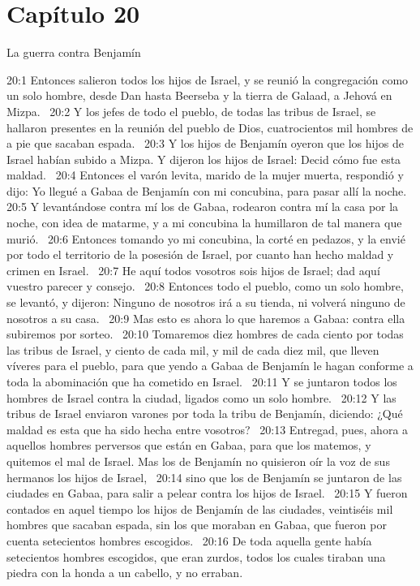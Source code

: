 \section*{Capítulo 20}
La guerra contra Benjamín  

20:1 Entonces salieron todos los hijos de Israel, y se reunió la congregación como un solo hombre, desde Dan hasta Beerseba y la tierra de Galaad, a Jehová en Mizpa.  
20:2 Y los jefes de todo el pueblo, de todas las tribus de Israel, se hallaron presentes en la reunión del pueblo de Dios, cuatrocientos mil hombres de a pie que sacaban espada.  
20:3 Y los hijos de Benjamín oyeron que los hijos de Israel habían subido a Mizpa. Y dijeron los hijos de Israel: Decid cómo fue esta maldad.  
20:4 Entonces el varón levita, marido de la mujer muerta, respondió y dijo: Yo llegué a Gabaa de Benjamín con mi concubina, para pasar allí la noche.  
20:5 Y levantándose contra mí los de Gabaa, rodearon contra mí la casa por la noche, con idea de matarme, y a mi concubina la humillaron de tal manera que murió.  
20:6 Entonces tomando yo mi concubina, la corté en pedazos, y la envié por todo el territorio de la posesión de Israel, por cuanto han hecho maldad y crimen en Israel.  
20:7 He aquí todos vosotros sois hijos de Israel; dad aquí vuestro parecer y consejo.  
20:8 Entonces todo el pueblo, como un solo hombre, se levantó, y dijeron: Ninguno de nosotros irá a su tienda, ni volverá ninguno de nosotros a su casa.  
20:9 Mas esto es ahora lo que haremos a Gabaa: contra ella subiremos por sorteo.  
20:10 Tomaremos diez hombres de cada ciento por todas las tribus de Israel, y ciento de cada mil, y mil de cada diez mil, que lleven víveres para el pueblo, para que yendo a Gabaa de Benjamín le hagan conforme a toda la abominación que ha cometido en Israel.  
20:11 Y se juntaron todos los hombres de Israel contra la ciudad, ligados como un solo hombre.  
20:12 Y las tribus de Israel enviaron varones por toda la tribu de Benjamín, diciendo: ¿Qué maldad es esta que ha sido hecha entre vosotros?  
20:13 Entregad, pues, ahora a aquellos hombres perversos que están en Gabaa, para que los matemos, y quitemos el mal de Israel. Mas los de Benjamín no quisieron oír la voz de sus hermanos los hijos de Israel,  
20:14 sino que los de Benjamín se juntaron de las ciudades en Gabaa, para salir a pelear contra los hijos de Israel.  
20:15 Y fueron contados en aquel tiempo los hijos de Benjamín de las ciudades, veintiséis mil hombres que sacaban espada, sin los que moraban en Gabaa, que fueron por cuenta setecientos hombres escogidos.  
20:16 De toda aquella gente había setecientos hombres escogidos, que eran zurdos, todos los cuales tiraban una piedra con la honda a un cabello, y no erraban.  

